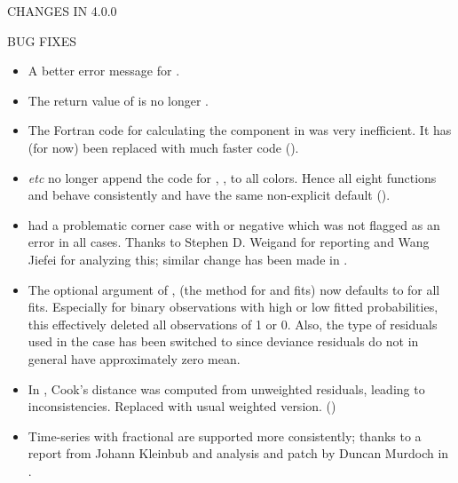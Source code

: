 \documentclass[letterpaper]{book}
\begin{document}
\begin{Section}{ CHANGES IN 4.0.0}
\begin{SubSection}{BUG FIXES}
\begin{itemize}
\item{}  A better error message for .

\item{} The return value of  is no longer
.

\item{} The Fortran code for calculating the 
component in  was very inefficient. It has
(for now) been replaced with much faster \R{} code ().

\item{}  \emph{etc} no longer append the code for
, , to all colors.  Hence all eight
 functions and  behave
consistently and have the same non-explicit default ().

\item{}  had a problematic corner case with  or negative  which was not flagged as an error in
all cases. Thanks to Stephen D. Weigand for reporting and Wang
Jiefei for analyzing this; similar change has been made in
.

\item{} The optional  argument of
, (the  method for  and
 fits) now defaults to  for all  fits.
Especially for binary observations with high or low fitted
probabilities, this effectively deleted all observations of 1 or
0.  Also, the type of residuals used in the  case has
been switched to  since deviance residuals do not
in general have approximately zero mean.

\item{} In , Cook's distance was computed from unweighted
residuals, leading to inconsistencies.  Replaced with usual weighted
version. ()

\item{} Time-series  with
fractional  are supported more consistently;
thanks to a report from Johann Kleinbub and analysis and patch by
Duncan Murdoch in .


\end{itemize}
\end{SubSection}
\end{Section}
\end{document}
